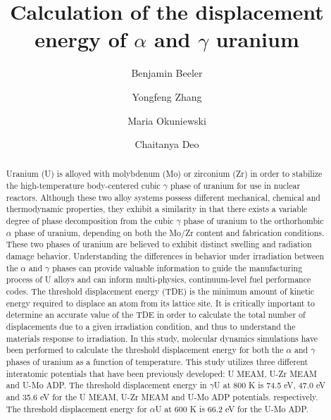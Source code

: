 \documentclass[review]{elsarticle}
\begin{document}
\begin{frontmatter}
\title{Calculation of the displacement energy of $\alpha$ and $\gamma$ uranium}

\author[inl]{Benjamin Beeler}
\author[inl]{Yongfeng Zhang}
\author[pur]{Maria Okuniewski}
\author[gatech]{Chaitanya Deo}
\address[inl]{Idaho National Laboratory, Idaho Falls, ID 83415}
\address[pur]{Purdue University, West Lafayette, IN 47907}
\address[gatech]{Georgia Institute of Technology, Atlanta, GA 30332}

\begin{abstract}

Uranium (U) is alloyed with molybdenum (Mo) or zirconium (Zr) in order to stabilize the high-temperature body-centered cubic $\gamma$ phase of uranium for use in nuclear reactors. Although these two alloy systems possess different mechanical, chemical and thermodynamic properties, they exhibit a similarity in that there exists a variable degree of phase decomposition from the cubic $\gamma$ phase of uranium to the orthorhombic $\alpha$ phase of uranium, depending on both the Mo/Zr content and fabrication conditions. These two phases of uranium are believed to exhibit distinct swelling and radiation damage behavior. Understanding the differences in behavior under irradiation between the $\alpha$ and $\gamma$ phases can provide valuable information to guide the manufacturing process of U alloys and can inform multi-physics, continuum-level fuel performance codes. The threshold displacement energy (TDE) is the minimum amount of kinetic energy required to displace an atom from its lattice site. It is critically important to determine an accurate value of the TDE in order to calculate the total number of displacements due to a given irradiation condition, and thus to understand the materials response to irradiation. In this study, molecular dynamics simulations have been performed to calculate the threshold displacement energy for both the $\alpha$ and $\gamma$ phases of uranium as a function of temperature. This study utilizes three different interatomic potentials that have been previously developed: U MEAM, U-Zr MEAM and U-Mo ADP. The threshold displacement energy in $\gamma$U at 800 K is 74.5 eV, 47.0 eV and 35.6 eV for the U MEAM, U-Zr MEAM and U-Mo ADP potentials. respectively. The threshold displacement energy for $\alpha$U at 600 K is 66.2 eV for the U-Mo ADP. 
\end{abstract}
\end{frontmatter}
\end{document}
